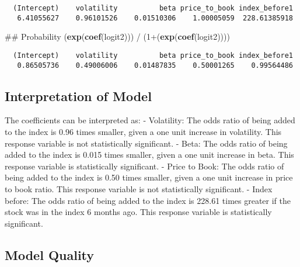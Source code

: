 \documentclass[12pt,twoside]{reedthesis}
\newenvironment{Shaded}{\begin{snugshade}}{\end{snugshade}}
\newcommand{\KeywordTok}[1]{\textcolor[rgb]{0.13,0.29,0.53}{\textbf{{#1}}}}
\newcommand{\DecValTok}[1]{\textcolor[rgb]{0.00,0.00,0.81}{{#1}}}
\newcommand{\StringTok}[1]{\textcolor[rgb]{0.31,0.60,0.02}{{#1}}}
\newcommand{\NormalTok}[1]{{#1}}
\theoremstyle{definition}
\theoremstyle{definition}
\theoremstyle{definition}
\theoremstyle{remark}
\begin{document}
\begin{verbatim}
  (Intercept)    volatility          beta price_to_book index_before1 
   6.41055627    0.96101526    0.01510306    1.00005059  228.61385918 
\end{verbatim}
\begin{Shaded}
\begin{Highlighting}[]
\NormalTok{## Probability }
\NormalTok{(}\KeywordTok{exp}\NormalTok{(}\KeywordTok{coef}\NormalTok{(logit2))) /}\StringTok{ }\NormalTok{(}\DecValTok{1}\NormalTok{+(}\KeywordTok{exp}\NormalTok{(}\KeywordTok{coef}\NormalTok{(logit2))))}
\end{Highlighting}
\end{Shaded}
\begin{verbatim}
  (Intercept)    volatility          beta price_to_book index_before1 
   0.86505736    0.49006006    0.01487835    0.50001265    0.99564486 
\end{verbatim}
\subsection{Interpretation of Model}\label{interpretation-of-model}

The coefficients can be interpreted as: \hfill\break
- Volatility: The odds ratio of being added to the index is 0.96 times
smaller, given a one unit increase in volatility. This response variable
is not statistically significant. \hfill\break
- Beta: The odds ratio of being added to the index is 0.015 times
smaller, given a one unit increase in beta. This response variable is
statistically significant. \hfill\break
- Price to Book: The odds ratio of being added to the index is 0.50
times smaller, given a one unit increase in price to book ratio. This
response variable is not statistically significant. \hfill\break
- Index before: The odds ratio of being added to the index is 228.61
times greater if the stock was in the index 6 months ago. This response
variable is statistically significant. \hfill\break
\hfill\break

\subsection{Model Quality}\label{model-quality-1}
\end{document}

